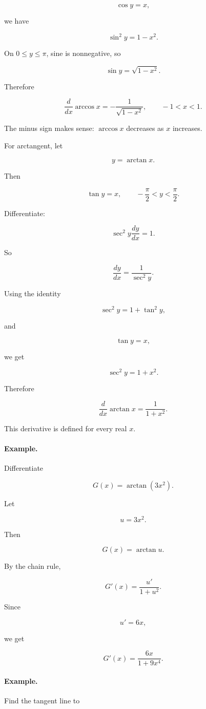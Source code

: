 \[
\cos y=x,
\]

we have

\[
\sin^2y=1-x^2.
\]

On \(0\le y\le\pi\), sine is nonnegative, so

\[
\sin y=\sqrt{1-x^2}.
\]

Therefore

\[
\boxed{
\frac{d}{dx}\arccos x=-\frac1{\sqrt{1-x^2}},
\qquad -1<x<1.
}
\]

The minus sign makes sense: \(\arccos x\) decreases as \(x\) increases.

For arctangent, let

\[
y=\arctan x.
\]

Then

\[
\tan y=x,
\qquad
-\frac{\pi}{2}<y<\frac{\pi}{2}.
\]

Differentiate:

\[
\sec^2 y\frac{dy}{dx}=1.
\]

So

\[
\frac{dy}{dx}=\frac1{\sec^2y}.
\]

Using the identity

\[
\sec^2 y=1+\tan^2y,
\]

and

\[
\tan y=x,
\]

we get

\[
\sec^2y=1+x^2.
\]

Therefore

\[
\boxed{
\frac{d}{dx}\arctan x=\frac1{1+x^2}.
}
\]

This derivative is defined for every real \(x\).

\paragraph{Example.}
Differentiate

\[
G(x)=\arctan(3x^2).
\]

Let

\[
u=3x^2.
\]

Then

\[
G(x)=\arctan u.
\]

By the chain rule,

\[
G'(x)=\frac{u'}{1+u^2}.
\]

Since

\[
u'=6x,
\]

we get

\[
\boxed{
G'(x)=\frac{6x}{1+9x^4}.
}
\]

\paragraph{Example.}
Find the tangent line to

